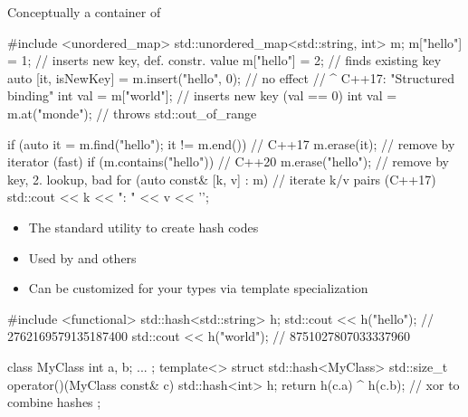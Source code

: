 \begin{frame}[fragile]
    \begin{block}{}
        Conceptually a container of 
    \end{block}
    \begin{cppcode*}{}
        #include <unordered_map>
        std::unordered_map<std::string, int> m;
        m["hello"] = 1;  // inserts new key, def. constr. value
        m["hello"] = 2;  // finds existing key
        auto [it, isNewKey] = m.insert({"hello", 0}); // no effect
        //   ^ C++17: "Structured binding"
        int val = m["world"];    // inserts new key (val == 0)
        int val = m.at("monde"); // throws std::out_of_range

        if (auto it = m.find("hello"); it != m.end()) // C++17
            m.erase(it);      // remove by iterator (fast)
        if (m.contains("hello")) // C++20
            m.erase("hello"); // remove by key, 2. lookup, bad
        for (auto const& [k, v] : m) // iterate k/v pairs (C++17)
            std::cout << k << ": " << v << '\n';
    \end{cppcode*}
\end{frame}

\begin{frame}[fragile]
    \begin{block}{}
        \begin{itemize}
            \item The standard utility to create hash codes
            \item Used by  and others
            \item Can be customized for your types via template specialization
        \end{itemize}
    \end{block}
    \begin{cppcode*}{}
        #include <functional>
        std::hash<std::string> h;
        std::cout << h("hello"); // 2762169579135187400
        std::cout << h("world"); // 8751027807033337960

        class MyClass { int a, b; ... };
        template<> struct std::hash<MyClass> {
          std::size_t operator()(MyClass const& c) {
            std::hash<int> h;
            return h(c.a) ^ h(c.b); // xor to combine hashes
          }
        };
    \end{cppcode*}
\end{frame}

